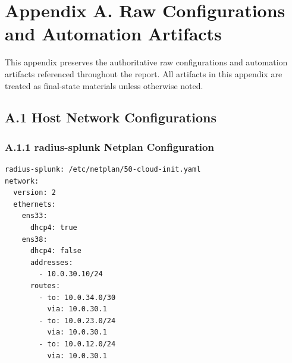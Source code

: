 \documentclass[11pt]{article}
\begin{document}
\appendix

\section{Appendix A. Raw Configurations and Automation Artifacts}
\label{sec:appendix-a-raw-configurations-and-automation-artifacts}

This appendix preserves the authoritative raw configurations and automation artifacts referenced throughout the report. All artifacts in this appendix are treated as final-state materials unless otherwise noted.


\subsection{A.1 Host Network Configurations}
\label{sec:appendix-a-host-network-configurations}


\subsubsection{A.1.1 radius-splunk Netplan Configuration}
\label{sec:appendix-a-radius-splunk-netplan-config}

\begin{verbatim}
radius-splunk: /etc/netplan/50-cloud-init.yaml
network:
  version: 2
  ethernets:
    ens33:
      dhcp4: true
    ens38:
      dhcp4: false
      addresses:
        - 10.0.30.10/24
      routes:
        - to: 10.0.34.0/30
          via: 10.0.30.1
        - to: 10.0.23.0/24
          via: 10.0.30.1
        - to: 10.0.12.0/24
          via: 10.0.30.1
\end{verbatim}
\end{document}
